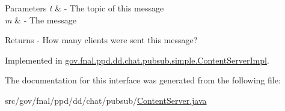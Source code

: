 \begin{DoxyParams}{Parameters}
{\em t} & -\/ The topic of this message \\
\hline
{\em m} & -\/ The message \\
\hline
\end{DoxyParams}
\begin{DoxyReturn}{Returns}
-\/ How many clients were sent this message? 
\end{DoxyReturn}


Implemented in \hyperlink{classgov_1_1fnal_1_1ppd_1_1dd_1_1chat_1_1pubsub_1_1simple_1_1ContentServerImpl_a8751b4e642ee674d78c127fa0ad41e60}{gov.\-fnal.\-ppd.\-dd.\-chat.\-pubsub.\-simple.\-Content\-Server\-Impl}.



The documentation for this interface was generated from the following file\-:\begin{DoxyCompactItemize}
\item 
src/gov/fnal/ppd/dd/chat/pubsub/\hyperlink{ContentServer_8java}{Content\-Server.\-java}\end{DoxyCompactItemize}
